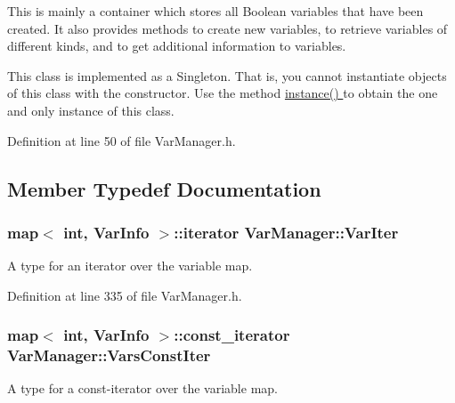 This is mainly a container which stores all Boolean variables that have been created. It also provides methods to create new variables, to retrieve variables of different kinds, and to get additional information to variables.

This class is implemented as a Singleton. That is, you cannot instantiate objects of this class with the constructor. Use the method \hyperlink{classVarManager_ac1a84b367c26dfc5ee9e612f7d61b288}{instance() } to obtain the one and only instance of this class. 

Definition at line 50 of file Var\-Manager.\-h.



\subsection{Member Typedef Documentation}
\hypertarget{classVarManager_a822fe2321e2d48725e4d9e63ab22843f}{
\subsubsection[{Var\-Iter}]{\setlength{\rightskip}{0pt plus 5cm}map$<$ int, {\bf Var\-Info} $>$\-::iterator {\bf Var\-Manager\-::\-Var\-Iter}\hspace{0.3cm}{\ttfamily [protected]}}}\label{classVarManager_a822fe2321e2d48725e4d9e63ab22843f}


A type for an iterator over the variable map. 



Definition at line 335 of file Var\-Manager.\-h.

\hypertarget{classVarManager_a93880917008b13ac5ce12b40312d3f4b}{
\subsubsection[{Vars\-Const\-Iter}]{\setlength{\rightskip}{0pt plus 5cm}map$<$ int, {\bf Var\-Info} $>$\-::const\-\_\-iterator {\bf Var\-Manager\-::\-Vars\-Const\-Iter}\hspace{0.3cm}{\ttfamily [protected]}}}\label{classVarManager_a93880917008b13ac5ce12b40312d3f4b}


A type for a const-\/iterator over the variable map. 



